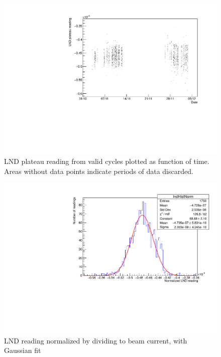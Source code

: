\documentclass[10pt,letterpaper]{article}
\begin{document}
\begin{figure}
\centering
\includegraphics[width=\textwidth,page=1]{../thermal_neutron_detector/lndReadingOverTime.pdf}
\caption{LND plateau reading from valid cycles plotted as function of time. Areas without data points indicate periods of data discarded.}
\label{fig:LNDreadings}
\end{figure}

\begin{figure}
\centering
\includegraphics[width=\textwidth,page=1]{../thermal_neutron_detector/lndHist.pdf}
\caption{LND reading normalized by dividing to beam current, with Gaussian fit}
\label{fig:LNDhist}
\end{figure}
\end{document}
